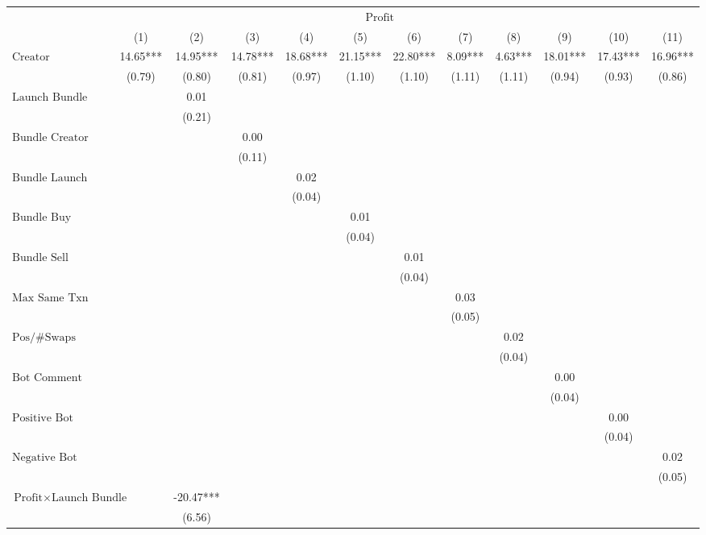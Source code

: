 \begin{tabular}{lccccccccccc}
\hline
 & \multicolumn{10}{c}{$\text{Profit}$} \\ & (1) & (2) & (3) & (4) & (5) & (6) & (7) & (8) & (9) & (10) & (11)\\
\hline
$\text{Creator}$& 14.65*** & 14.95*** & 14.78*** & 18.68*** & 21.15*** & 22.80*** & 8.09*** & 4.63*** & 18.01*** & 17.43*** & 16.96*** \\
& (0.79) & (0.80) & (0.81) & (0.97) & (1.10) & (1.10) & (1.11) & (1.11) & (0.94) & (0.93) & (0.86) \\
$\text{Launch Bundle}$&  & 0.01 &  &  &  &  &  &  &  &  &  \\
&  & (0.21) &  &  &  &  &  &  &  &  &  \\
$\text{Bundle Creator Buy}$&  &  & 0.00 &  &  &  &  &  &  &  &  \\
&  &  & (0.11) &  &  &  &  &  &  &  &  \\
$\text{Bundle Launch}$&  &  &  & 0.02 &  &  &  &  &  &  &  \\
&  &  &  & (0.04) &  &  &  &  &  &  &  \\
$\text{Bundle Buy}$&  &  &  &  & 0.01 &  &  &  &  &  &  \\
&  &  &  &  & (0.04) &  &  &  &  &  &  \\
$\text{Bundle Sell}$&  &  &  &  &  & 0.01 &  &  &  &  &  \\
&  &  &  &  &  & (0.04) &  &  &  &  &  \\
$\text{Max Same Txn}$&  &  &  &  &  &  & 0.03 &  &  &  &  \\
&  &  &  &  &  &  & (0.05) &  &  &  &  \\
$\text{Pos/\#Swaps}$&  &  &  &  &  &  &  & 0.02 &  &  &  \\
&  &  &  &  &  &  &  & (0.04) &  &  &  \\
$\text{Bot Comment}$&  &  &  &  &  &  &  &  & 0.00 &  &  \\
&  &  &  &  &  &  &  &  & (0.04) &  &  \\
$\text{Positive Bot Comment}$&  &  &  &  &  &  &  &  &  & 0.00 &  \\
&  &  &  &  &  &  &  &  &  & (0.04) &  \\
$\text{Negative Bot Comment}$&  &  &  &  &  &  &  &  &  &  & 0.02 \\
&  &  &  &  &  &  &  &  &  &  & (0.05) \\
$\text{Profit} \times \text{Launch Bundle}$&  & -20.47*** &  &  &  &  &  &  &  &  &  \\
&  & (6.56) &  &  &  &  &  &  &  &  &  \\

\end{tabular}
